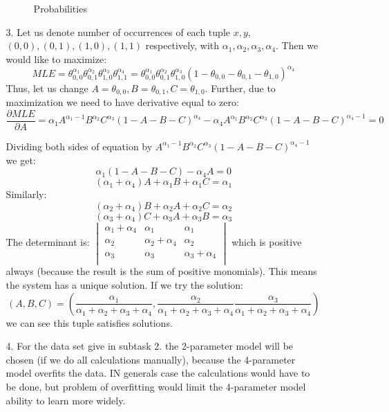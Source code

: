 \documentclass[10pt,a4paper]{article}
\begin{document}
\begin{enumerate}
\begin{enumerate}
\begin{figure}[htb!]
\begin{center}
\begin{tabular}{c|cc}
\end{tabular} 
\end{center}
\caption{Probabilities}
\label{fig:prediction}
\end{figure} 
\item[3.]
Let us denote number of occurrences  of each tuple $x, y$, $(0, 0), (0, 1), (1, 0), (1, 1)$ respectively, with $\alpha_1, \alpha_2, \alpha_3, \alpha_4$. Then we would like to maximize:
$$MLE=\theta_{0,0}^{\alpha_1}\theta_{0, 1}^{\alpha_2}\theta_{1, 0}^{\alpha_3}\theta_{1, 1}^{\alpha_4} =\theta_{0,0}^{\alpha_1}\theta_{0, 1}^{\alpha_2}\theta_{1, 0}^{\alpha_3}(1-\theta_{0, 0}-\theta_{0, 1}-\theta_{1, 0})^{\alpha_4}$$ 
Thus, let us change $A = \theta_{0, 0}, B=\theta_{0, 1}, C=\theta_{1, 0}$. Further, due to maximization we need to have derivative equal to zero:
$$\frac{\partial MLE}{\partial A} =\alpha_1 A^{\alpha_1-1}B^{\alpha_2}C^{\alpha_3}(1-A-B-C)^{\alpha_4} -\alpha_4 A^{\alpha_1}B^{\alpha_2}C^{\alpha_3}(1-A-B-C)^{\alpha_4 -1}=0 $$


	Dividing both sides of equation by $A^{\alpha_1-1}B^{\alpha_2}C^{\alpha_3}(1-A-B-C)^{\alpha_4 -1}$ we get:
$$\alpha_1(1-A-B-C)-\alpha_4A=0$$
$$(\alpha_1 + \alpha_4 )A + \alpha_1B +\alpha_1C = \alpha_1$$
Similarly:
$$(\alpha_2 + \alpha_4 )B + \alpha_2A +\alpha_2C = \alpha_2$$
$$(\alpha_3 + \alpha_4 )C + \alpha_3A +\alpha_3B = \alpha_3$$
The determinant is:
$\begin{vmatrix}
\alpha_1 + \alpha_4 & \alpha_1 & \alpha_1 \\ 
\alpha_2 & \alpha_2 + \alpha_4 & \alpha_2 \\ 
\alpha_3 & \alpha_3 &  \alpha_3 + \alpha_4\\ 
\end{vmatrix}$
which is positive always (because the result is the sum of positive monomials).
This means the system has a unique solution.
If we try the solution: $$(A, B, C) = \left(\frac{\alpha_1}{\alpha_1 + \alpha_2+\alpha_3+\alpha_4},
 \frac{\alpha_2}{\alpha_1 + \alpha_2+\alpha_3+\alpha_4}
 \frac{\alpha_3}{\alpha_1 + \alpha_2+\alpha_3+\alpha_4}\right)$$ we can see this tuple satisfies solutions. 
 \item [4.]
 For the data set give in subtask 2. the 2-parameter model will be chosen (if we do all calculations manually), because the 4-parameter model overfits the data.
 IN generals case the calculations would have to be done, but problem of overfitting would limit the 4-parameter model ability to learn more widely.  
\end{enumerate}
\end{enumerate}
\end{document}
